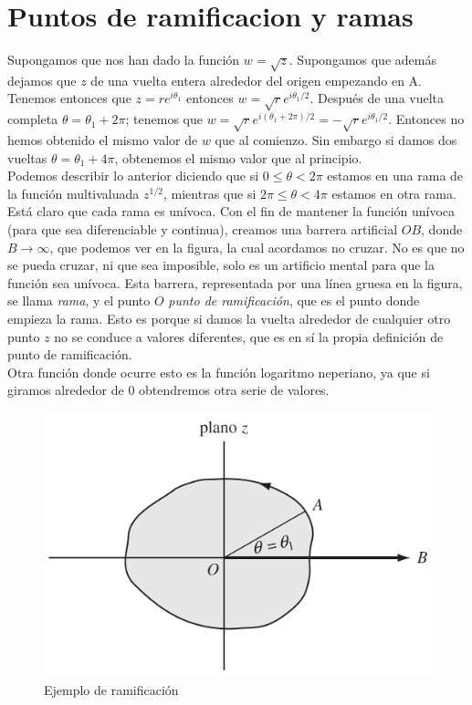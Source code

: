 \documentclass[12pt,a4paper]{book}
\begin{document}
\section{Puntos de ramificacion y ramas}

Supongamos que nos han dado la función  $w = \sqrt{z}$. Supongamos que además dejamos que $z$ de una vuelta entera alrededor del origen empezando en A. Tenemos entonces que $z=re^{i\theta_1}$ entonces $w = \sqrt{r} e^{i \theta_1 /2}$. Después de una vuelta completa $\theta = \theta_1 + 2\pi$; tenemos que $w = \sqrt{r} e^{i (\theta_1 +2 \pi)/2} = - \sqrt{r} e^{i \theta_1 /2}$. Entonces no hemos obtenido el mismo valor de $w$ que al comienzo. Sin embargo si damos dos vueltas $\theta = \theta_1 + 4 \pi$, obtenemos el mismo valor que al principio.  \\

Podemos describir lo anterior diciendo que si $0 \leq \theta < 2 \pi$ estamos en una rama de la función multivaluada $z^{1/2}$, mientras que si $ 2 \pi \leq \theta < 4 \pi $ estamos en otra rama. \\

Está claro que cada rama es unívoca. Con el fin de mantener la función unívoca (para que sea diferenciable y continua), creamos una barrera artificial $OB$, donde $B \rightarrow \infty$, que podemos ver en la figura, la cual acordamos no cruzar. No es que no se pueda cruzar, ni que sea imposible, solo es un artificio mental para que la función sea unívoca. Esta barrera, representada por una línea gruesa en la figura, se llama \textit{rama}, y el punto $O$ \textit{punto de ramificación}, que es el punto donde empieza la rama. Esto es porque si damos la vuelta alrededor de cualquier otro punto $z$ no se conduce a valores diferentes, que es en sí la propia definición de punto de ramificación. \\

Otra función donde ocurre esto es la función logaritmo neperiano, ya que si giramos alrededor de $0$ obtendremos otra serie de valores.

\begin{figure}[h!] \centering
\includegraphics[scale=0.3]{ramificaciones.png}
\caption{Ejemplo de ramificación}
\end{figure}
\end{document}
